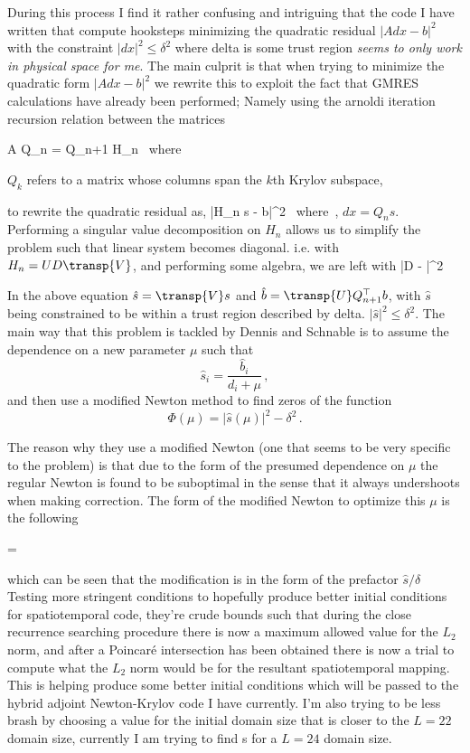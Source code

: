 During this process I find it rather confusing and intriguing that the code I have written that
compute hooksteps minimizing the quadratic residual $|A dx - b |^2$ with the constraint $|dx|^2 \leq \delta^2$
where delta is some trust region \emph{seems to only work in physical space for me}. The main culprit is that
when trying to minimize the quadratic form $|A dx - b |^2$ we rewrite this to exploit the fact that
GMRES calculations have already been performed; Namely using the arnoldi iteration recursion relation between
the matrices

\beq \nonumber
A Q_n = Q_{n+1} H_n \, \mbox{where} \,
\eeq

$Q_k$ refers to a matrix whose columns span the $k$th Krylov subspace,

to rewrite the quadratic residual as,
\beq \nonumber
|H_n s - b|^2 \, \mbox{where} \,,
\eeq
$dx = Q_n s$. Performing a singular value decomposition on $H_n$ allows us to simplify the problem such that
linear system becomes diagonal. i.e. with $H_n = U D \transp{V}$, and performing some algebra, we are left with
\beq \nonumber
|D  - |^2
\eeq

In the above equation $\hat{s} = \transp{V} s $ and
$\hat{b} = \transp{U} Q_{n+1}^{\top} b$, with $\hat{s}$ being
constrained to be within a trust region described by delta. $|\hat{s}|^2 \leq
\delta^2$. The main way that this problem is tackled by Dennis and Schnable
 is to assume the dependence on a new parameter $\mu$ such that
\[
\hat{s}_i = \frac{\hat{b}_i}{d_i + \mu}
\,,
\]
and then use a modified Newton method to find zeros of the function
\[
\Phi (\mu) = |\hat{s}(\mu)|^2 - \delta^2
\,.
\]

The reason why they use a modified Newton (one that seems to be very specific to the problem) is that
due to the form of the presumed dependence on $\mu$ the regular Newton is found to be suboptimal in
the sense that it always undershoots when making correction. The form of the modified Newton to optimize
this $\mu$ is the following

\beq
\Delta \mu = 
\eeq

which can be seen that the modification is in the form of the prefactor $\hat{s} / \delta$
Testing more stringent conditions to hopefully produce better initial conditions for spatiotemporal
code, they're crude bounds such that during the close recurrence searching procedure there is now a maximum
allowed value for the $L_2$ norm, and after a Poincar\'e intersection has been obtained there is now
a trial to compute what the $L_2$ norm would be for the resultant spatiotemporal mapping. This is helping
produce some better initial conditions which will be passed to the hybrid adjoint Newton-Krylov code I have
currently. I'm also trying to be less brash by choosing a value for the initial domain size that is closer
to the $L=22$ domain size, currently I am trying to find \ppo s for a $L=24$ domain size.

